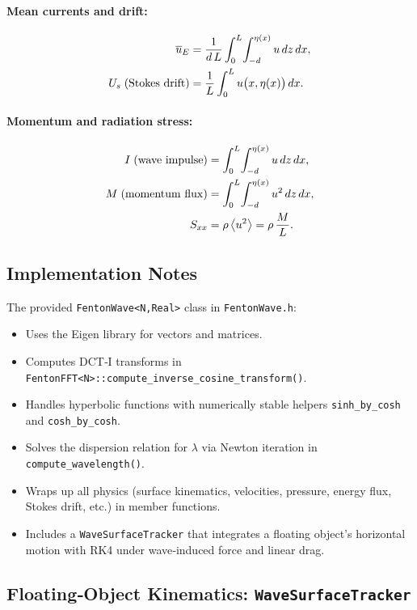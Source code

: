 \documentclass{article}
\begin{document}
\paragraph{Mean currents and drift:}
\begin{align}
\overline{u}_{E} 
&= \frac{1}{d\,L}\int_{0}^{L}\!\int_{-d}^{\eta(x)} u\,dz\,dx, 
\\
U_{s}\;({\rm Stokes\ drift})
&= \frac{1}{L}\int_{0}^{L} u\bigl(x,\eta(x)\bigr)\,dx.
\end{align}

\paragraph{Momentum and radiation stress:}
\begin{align}
I\;({\rm wave\ impulse})
&= \int_{0}^{L}\!\int_{-d}^{\eta(x)} u\,dz\,dx, 
\\
M\;({\rm momentum\ flux})
&= \int_{0}^{L}\!\int_{-d}^{\eta(x)} u^{2}\,dz\,dx, 
\\
S_{xx}
&= \rho\,\bigl\langle u^{2}\bigr\rangle
   = \rho\,\frac{M}{L}.
\end{align}

\subsection{Implementation Notes}

The provided \verb|FentonWave<N,Real>| class in \texttt{FentonWave.h}:
\begin{itemize}
  \item Uses the Eigen library for vectors and matrices.
  \item Computes DCT‐I transforms in \verb|FentonFFT<N>::compute_inverse_cosine_transform()|.
  \item Handles hyperbolic functions with numerically stable helpers \verb|sinh_by_cosh| and \verb|cosh_by_cosh|.
  \item Solves the dispersion relation for $\lambda$ via Newton iteration in \verb|compute_wavelength()|.
  \item Wraps up all physics (surface kinematics, velocities, pressure, energy flux, Stokes drift, etc.) in member functions.
  \item Includes a \verb|WaveSurfaceTracker| that integrates a floating object’s horizontal motion with RK4 under wave‐induced force and linear drag.
\end{itemize}

\subsection{Floating‐Object Kinematics: \texttt{WaveSurfaceTracker}}
\label{sec:wave_surface_tracker}
\end{document}

